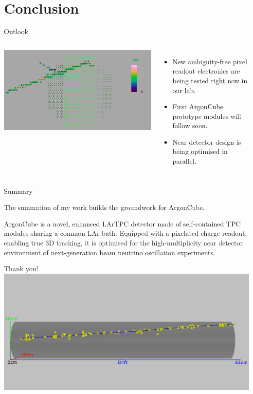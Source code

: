 \documentclass[]{beamer}
\newcommand*{\AC}{{ArgonCube}}
\newcommand*{\lar}{{LAr}}
\newcommand*{\lartpc}{{LArTPC}}
\begin{document}
\section{Conclusion}

\begin{frame}{Outlook}
	\begin{columns}[c]
		\centering
		\includegraphics[width=\textwidth]{defence/larpix_event}
		\begin{itemize}
			\item New ambiguity-free pixel readout electronics are being tested right now in our lab.
			\item First \AC{} prototype modules will follow soon.
			\item Near detector design is being optimised in parallel.
		\end{itemize}
	\end{columns}
\end{frame}

\begin{frame}{Summary}
	\begin{block}{}
		The summation of my work builds the groundwork for \AC{}.
	\end{block}
	
	\begin{block}{}
		\AC{} is a novel, enhanced \lartpc{} detector made of self-contained TPC modules sharing a common \lar{} bath.
		Equipped with a pixelated charge readout, enabling true 3D tracking, it is optimised for the high-multiplicity near detector environment of next-generation beam neutrino oscillation experiments.
	\end{block}
\end{frame}

\begin{frame}{Thank you!}
	\centering
	\includegraphics[width=\textwidth]{viper/event967_kalman}
\end{frame}
\end{document}
